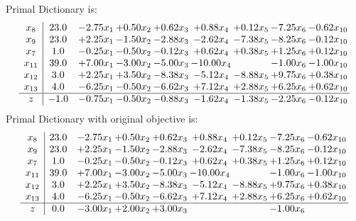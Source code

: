 \documentclass[9pt]{article}
\begin{document}
Primal Dictionary is:
\[\begin{array}{c| c c@{\hskip 2pt} c@{\hskip 2pt} c@{\hskip 2pt} c@{\hskip 2pt} c@{\hskip 2pt} c@{\hskip 2pt} c@{\hskip 2pt} }
 x_{8}   &  23.0 & -2.75 x_{1} & +  0.50 x_{2} & +  0.62 x_{3} & +  0.88 x_{4} & +  0.12 x_{5} & -7.25 x_{6} & -0.62 x_{10}\\
 x_{9}   &  23.0 & +  2.25 x_{1} & -1.50 x_{2} & -2.88 x_{3} & -2.62 x_{4} & -7.38 x_{5} & -8.25 x_{6} & -0.12 x_{10}\\
 x_{7}   &  1.0 & -0.25 x_{1} & -0.50 x_{2} & -0.12 x_{3} & +  0.62 x_{4} & +  0.38 x_{5} & +  1.25 x_{6} & +  0.12 x_{10}\\
 x_{11}   &  39.0 & +  7.00 x_{1} & -3.00 x_{2} & -5.00 x_{3} & -10.00 x_{4} &   & -1.00 x_{6} & -1.00 x_{10}\\
 x_{12}   &  3.0 & +  2.25 x_{1} & +  3.50 x_{2} & -8.38 x_{3} & -5.12 x_{4} & -8.88 x_{5} & +  9.75 x_{6} & +  0.38 x_{10}\\
 x_{13}   &  4.0 & -6.25 x_{1} & -0.50 x_{2} & -6.62 x_{3} & +  7.12 x_{4} & +  2.88 x_{5} & +  6.25 x_{6} & +  0.62 x_{10}\\
\hline
z    &  -1.0 & -0.75 x_{1} & -0.50 x_{2} & -0.88 x_{3} & -1.62 x_{4} & -1.38 x_{5} & -2.25 x_{6} & -0.12 x_{10}\\
\end{array}\]
Primal Dictionary with original objective is:
\[\begin{array}{c| c c@{\hskip 2pt} c@{\hskip 2pt} c@{\hskip 2pt} c@{\hskip 2pt} c@{\hskip 2pt} c@{\hskip 2pt} c@{\hskip 2pt} }
 x_{8}   &  23.0 & -2.75 x_{1} & +  0.50 x_{2} & +  0.62 x_{3} & +  0.88 x_{4} & +  0.12 x_{5} & -7.25 x_{6} & -0.62 x_{10}\\
 x_{9}   &  23.0 & +  2.25 x_{1} & -1.50 x_{2} & -2.88 x_{3} & -2.62 x_{4} & -7.38 x_{5} & -8.25 x_{6} & -0.12 x_{10}\\
 x_{7}   &  1.0 & -0.25 x_{1} & -0.50 x_{2} & -0.12 x_{3} & +  0.62 x_{4} & +  0.38 x_{5} & +  1.25 x_{6} & +  0.12 x_{10}\\
 x_{11}   &  39.0 & +  7.00 x_{1} & -3.00 x_{2} & -5.00 x_{3} & -10.00 x_{4} &   & -1.00 x_{6} & -1.00 x_{10}\\
 x_{12}   &  3.0 & +  2.25 x_{1} & +  3.50 x_{2} & -8.38 x_{3} & -5.12 x_{4} & -8.88 x_{5} & +  9.75 x_{6} & +  0.38 x_{10}\\
 x_{13}   &  4.0 & -6.25 x_{1} & -0.50 x_{2} & -6.62 x_{3} & +  7.12 x_{4} & +  2.88 x_{5} & +  6.25 x_{6} & +  0.62 x_{10}\\
\hline
z    &  0.0 & -3.00 x_{1} & +  2.00 x_{2} & +  3.00 x_{3} &    &   & -1.00 x_{6} &   \\
\end{array}\]
\end{document}
